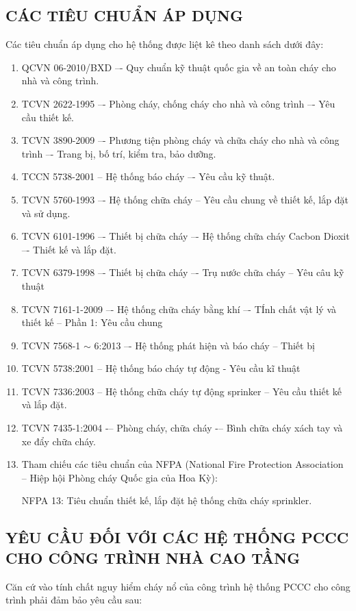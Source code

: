 \subsection{CÁC TIÊU CHUẨN ÁP DỤNG}
Các tiêu chuẩn áp dụng cho hệ thống được liệt kê theo danh sách dưới đây:
\begin{enumerate}
	\item QCVN 06-2010/BXD –- Quy chuẩn kỹ thuật quốc gia về an toàn cháy cho nhà và công trình.
	\item TCVN 2622-1995 –- Phòng cháy, chống cháy cho nhà và công trình –- Yêu cầu thiết kế.
	\item TCVN 3890-2009 –- Phương tiện phòng cháy và chữa cháy cho nhà và công trình –- Trang bị, bố trí, kiểm tra, bảo dưỡng.
	\item TCCN 5738-2001 -- Hệ thống báo cháy –- Yêu cầu kỹ thuật.
	\item TCVN 5760-1993 –- Hệ thống chữa cháy – Yêu cầu chung về thiết kế, lắp đặt và sử dụng.
	\item TCVN 6101-1996 –- Thiết bị chữa cháy –- Hệ thống chữa cháy Cacbon Dioxit –- Thiết kế và lắp đặt.
	\item TCVN 6379-1998 –- Thiết bị chữa cháy –- Trụ nước chữa cháy – Yêu câu kỹ thuật
	\item TCVN 7161-1-2009 –- Hệ thống chữa cháy bằng khí –- TÍnh chất vật lý và thiết kế -- Phần 1: Yêu cầu chung
	\item TCVN 7568-1 $\sim$ 6:2013 –- Hệ thống phát hiện và báo cháy – Thiết bị
	\item TCVN 5738:2001 -- Hệ thống báo cháy tự động - Yêu cầu kĩ thuật
	\item TCVN 7336:2003 -- Hệ thống chữa cháy tự động sprinker – Yêu cầu thiết kế và lắp đặt.
	\item TCVN 7435-1:2004 -– Phòng cháy, chữa cháy -– Bình chữa cháy xách tay và xe đẩy chữa cháy.
	\item Tham chiếu các tiêu chuẩn của NFPA (National Fire Protection Association -- Hiệp hội Phòng cháy Quốc gia của Hoa Kỳ):
	
	NFPA 13: Tiêu chuẩn thiết kế, lắp đặt hệ thống chữa cháy sprinkler.
\end{enumerate}

\subsection{YÊU CẦU ĐỐI VỚI CÁC HỆ THỐNG PCCC CHO CÔNG TRÌNH NHÀ CAO TẦNG}
Căn cứ vào tính chất nguy hiểm cháy nổ của công trình hệ thống PCCC cho công trình phải đảm bảo yêu cầu sau:
